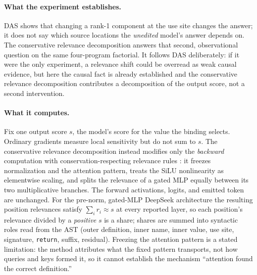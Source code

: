 \documentclass[10pt]{article}
\newcommand{\code}[1]{\texttt{#1}}
\begin{document}
\paragraph{What the experiment establishes.} DAS shows that changing a rank-1
component at the use site changes the answer; it does not say which source
locations the \emph{unedited} model's answer depends on. The conservative relevance decomposition answers that
second, observational question on the same four-program factorial. It follows DAS
deliberately: if it were the only experiment, a relevance shift could be
overread as weak causal evidence, but here the causal fact is already established
and the conservative relevance decomposition contributes a decomposition of the output score, not a second
intervention.

\paragraph{What it computes.} Fix one output score $s$, the model's score for the
value the binding selects. Ordinary gradients measure local sensitivity but do
not sum to $s$. The conservative relevance decomposition instead modifies only the \emph{backward} computation
with conservation-respecting relevance rules
\citep{bach2015lrp,ali2022xai,achtibat2024attnlrp}: it freezes normalization and
the attention pattern, treats the SiLU nonlinearity as elementwise scaling, and
splits the relevance of a gated MLP equally between its two multiplicative
branches. The forward activations, logits, and emitted token are unchanged. For
the pre-norm, gated-MLP DeepSeek architecture the resulting position relevances
satisfy $\sum_i r_i \approx s$ at every reported layer, so each position's
relevance divided by a \emph{positive} $s$ is a share; shares are summed into
syntactic roles read from the AST (outer definition, inner name, inner value, use
site, signature, \code{return}, suffix, residual). Freezing the attention pattern
is a stated limitation: the method attributes what the fixed pattern transports,
not how queries and keys formed it, so it cannot establish the mechanism
``attention found the correct definition.''
\end{document}
